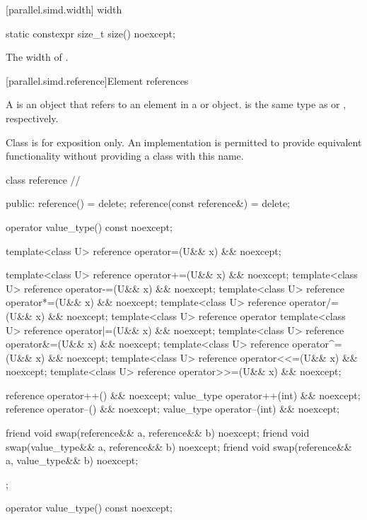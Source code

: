 [parallel.simd.width]{ width}

\begin{itemdecl}
static constexpr size_t size() noexcept;
\end{itemdecl}

\begin{itemdescr}
  \pnum\returns
  The width of .
\end{itemdescr}

[parallel.simd.reference]{Element references}

\pnum
A  is an object that refers to an element in a  or  object.  is the same type as  or , respectively.

\pnum
Class  is for exposition only. An implementation is permitted to provide equivalent functionality without providing a class with this name.

\begin{codeblock}
class reference // \expos
{
public:
  reference() = delete;
  reference(const reference&) = delete;

  operator value_type() const noexcept;

  template<class U> reference operator=(U&& x) && noexcept;

  template<class U> reference operator+=(U&& x) && noexcept;
  template<class U> reference operator-=(U&& x) && noexcept;
  template<class U> reference operator*=(U&& x) && noexcept;
  template<class U> reference operator/=(U&& x) && noexcept;
  template<class U> reference operator%
  template<class U> reference operator|=(U&& x) && noexcept;
  template<class U> reference operator&=(U&& x) && noexcept;
  template<class U> reference operator^=(U&& x) && noexcept;
  template<class U> reference operator<<=(U&& x) && noexcept;
  template<class U> reference operator>>=(U&& x) && noexcept;

  reference operator++() && noexcept;
  value_type operator++(int) && noexcept;
  reference operator--() && noexcept;
  value_type operator--(int) && noexcept;

  friend void swap(reference&& a, reference&& b) noexcept;
  friend void swap(value_type&& a, reference&& b) noexcept;
  friend void swap(reference&& a, value_type&& b) noexcept;
};
\end{codeblock}

\begin{itemdecl}
operator value_type() const noexcept;
\end{itemdecl}

